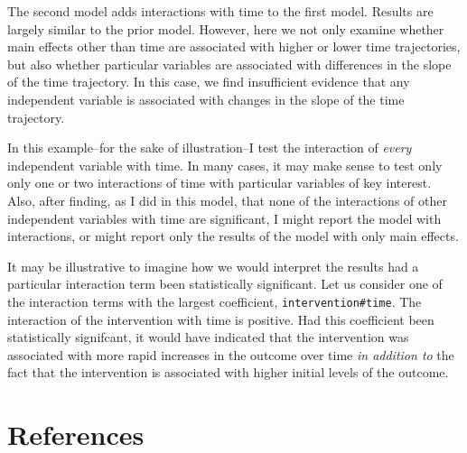 \documentclass[
  letterpaper,
  DIV=11,
  numbers=noendperiod]{scrreprt}
\begin{document}
The second model adds interactions with time to the first model. Results
are largely similar to the prior model. However, here we not only
examine whether main effects other than time are associated with higher
or lower time trajectories, but also whether particular variables are
associated with differences in the slope of the time trajectory. In this
case, we find insufficient evidence that any independent variable is
associated with changes in the slope of the time trajectory.

\begin{tcolorbox}[enhanced jigsaw, toprule=.15mm, colback=white, titlerule=0mm, leftrule=.75mm, rightrule=.15mm, opacityback=0, arc=.35mm, bottomrule=.15mm, colbacktitle=quarto-callout-tip-color!10!white, left=2mm, colframe=quarto-callout-tip-color-frame, bottomtitle=1mm, toptitle=1mm, coltitle=black, breakable, title=\textcolor{quarto-callout-tip-color}{\faLightbulb}\hspace{0.5em}{Which Interactions To Test?}, opacitybacktitle=0.6]

In this example--for the sake of illustration--I test the interaction of
\emph{every} independent variable with time. In many cases, it may make
sense to test only only one or two interactions of time with particular
variables of key interest. Also, after finding, as I did in this model,
that none of the interactions of other independent variables with time
are significant, I might report the model with interactions, or might
report only the results of the model with only main effects.

\end{tcolorbox}

It may be illustrative to imagine how we would interpret the results had
a particular interaction term been statistically significant. Let us
consider one of the interaction terms with the largest coefficient,
\texttt{intervention\#time}. The interaction of the intervention with
time is positive. Had this coefficient been statistically signifcant, it
would have indicated that the intervention was associated with more
rapid increases in the outcome over time \emph{in addition to} the fact
that the intervention is associated with higher initial levels of the
outcome.


\chapter*{References}\label{references}
\end{document}
